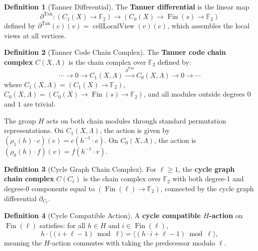 \documentclass[11pt]{article}
\theoremstyle{plain}
\theoremstyle{definition}
\newtheorem*{definition}{Definition}
\theoremstyle{remark}
\begin{document}
\begin{definition}[Tanner Differential]
The \textbf{Tanner differential} is the linear map
\[
\partial^{\mathrm{Tan}} : (C_1(X) \to \mathbb{F}_2) \to (C_0(X) \to \operatorname{Fin}(s) \to \mathbb{F}_2)
\]
defined by $\partial^{\mathrm{Tan}}(c)(v) = \operatorname{cellLocalView}(v)(c)$, which assembles the local views at all vertices.
\end{definition}

\begin{definition}[Tanner Code Chain Complex]
The \textbf{Tanner code chain complex} $C(X, \Lambda)$ is the chain complex over $\mathbb{F}_2$ defined by:
\[
\cdots \to 0 \to C_1(X,\Lambda) \xrightarrow{\partial^{\mathrm{Tan}}} C_0(X,\Lambda) \to 0 \to \cdots
\]
where $C_1(X,\Lambda) = (C_1(X) \to \mathbb{F}_2)$, $C_0(X,\Lambda) = (C_0(X) \to \operatorname{Fin}(s) \to \mathbb{F}_2)$, and all modules outside degrees $0$ and $1$ are trivial.
\end{definition}

The group $H$ acts on both chain modules through standard permutation representations. On $C_1(X,\Lambda)$, the action is given by $(\rho_1(h) \cdot c)(e) = c(h^{-1} \cdot e)$. On $C_0(X,\Lambda)$, the action is $(\rho_0(h) \cdot f)(v) = f(h^{-1} \cdot v)$.

\begin{definition}[Cycle Graph Chain Complex]
For $\ell \geq 1$, the \textbf{cycle graph chain complex} $C(C_\ell)$ is the chain complex over $\mathbb{F}_2$ with both degree-1 and degree-0 components equal to $(\operatorname{Fin}(\ell) \to \mathbb{F}_2)$, connected by the cycle graph differential $\partial_{C_\ell}$.
\end{definition}

\begin{definition}[Cycle Compatible Action]
A \textbf{cycle compatible $H$-action} on $\operatorname{Fin}(\ell)$ satisfies: for all $h \in H$ and $i \in \operatorname{Fin}(\ell)$,
\[
h \cdot \langle (i + \ell - 1) \bmod \ell \rangle = \langle (h \cdot i + \ell - 1) \bmod \ell \rangle,
\]
meaning the $H$-action commutes with taking the predecessor modulo $\ell$.
\end{definition}
\end{document}
